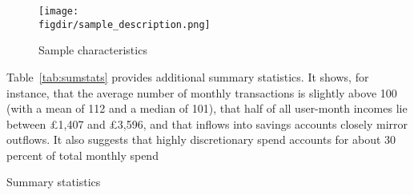 \begin{figure}[H]
    \centering
    \caption{Sample characteristics}
    \texttt{[image: \\figdir/sample\_description.png]}
    \label{fig:sample_description}
\end{figure}

Table~\ref{tab:sumstats} provides additional summary statistics. It shows, for
instance, that the average number of monthly transactions is slightly above 100
(with a mean of 112 and a median of 101), that half of all user-month incomes
lie between \pounds1,407 and \pounds3,596, and that inflows into savings
accounts closely mirror outflows. It also suggests that highly discretionary
spend accounts for about 30 percent of total monthly spend

\begin{table}[ht]
\centering\tiny
\caption{Summary statistics}
\label{tab:sumstats}

\end{table}

